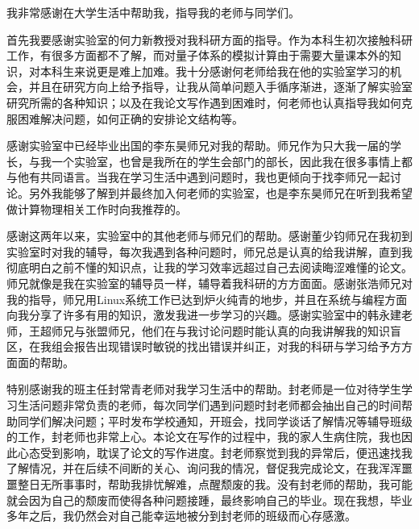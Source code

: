 
\begin{acknowledgements}

我非常感谢在大学生活中帮助我，指导我的老师与同学们。

首先我要感谢实验室的何力新教授对我科研方面的指导。作为本科生初次接触科研工作，有很多方面都不了解，而对量子体系的模拟计算由于需要大量课本外的知识，对本科生来说更是难上加难。我十分感谢何老师给我在他的实验室学习的机会，并且在研究方向上给予指导，让我从简单问题入手循序渐进，逐渐了解实验室研究所需的各种知识；以及在我论文写作遇到困难时，何老师也认真指导我如何克服困难解决问题，如何正确的安排论文结构等。

感谢实验室中已经毕业出国的李东昊师兄对我的帮助。师兄作为只大我一届的学长，与我一个实验室，也曾是我所在的学生会部门的部长，因此我在很多事情上都与他有共同语言。当我在学习生活中遇到问题时，我也更倾向于找李师兄一起讨论。另外我能够了解到并最终加入何老师的实验室，也是李东昊师兄在听到我希望做计算物理相关工作时向我推荐的。

感谢这两年以来，实验室中的其他老师与师兄们的帮助。感谢董少钧师兄在我初到实验室时对我的辅导，每次我遇到各种问题时，师兄总是认真的给我讲解，直到我彻底明白之前不懂的知识点，让我的学习效率远超过自己去阅读晦涩难懂的论文。师兄就像是我在实验室的辅导员一样，辅导着我科研的方方面面。感谢张浩师兄对我的指导，师兄用Linux系统工作已达到炉火纯青的地步，并且在系统与编程方面向我分享了许多有用的知识，激发我进一步学习的兴趣。感谢实验室中的韩永建老师，王超师兄与张盟师兄，他们在与我讨论问题时能认真的向我讲解我的知识盲区，在我组会报告出现错误时敏锐的找出错误并纠正，对我的科研与学习给予方方面面的帮助。

特别感谢我的班主任封常青老师对我学习生活中的帮助。封老师是一位对待学生学习生活问题非常负责的老师，每次同学们遇到问题时封老师都会抽出自己的时间帮助同学们解决问题；平时发布学校通知，开班会，找同学谈话了解情况等辅导班级的工作，封老师也非常上心。本论文在写作的过程中，我的家人生病住院，我也因此心态受到影响，耽误了论文的写作进度。封老师察觉到我的异常后，便迅速找我了解情况，并在后续不间断的关心、询问我的情况，督促我完成论文，在我浑浑噩噩整日无所事事时，帮助我排忧解难，点醒颓废的我。没有封老师的帮助，我可能就会因为自己的颓废而使得各种问题接踵，最终影响自己的毕业。现在我想，毕业多年之后，我仍然会对自己能幸运地被分到封老师的班级而心存感激。

\end{acknowledgements}
